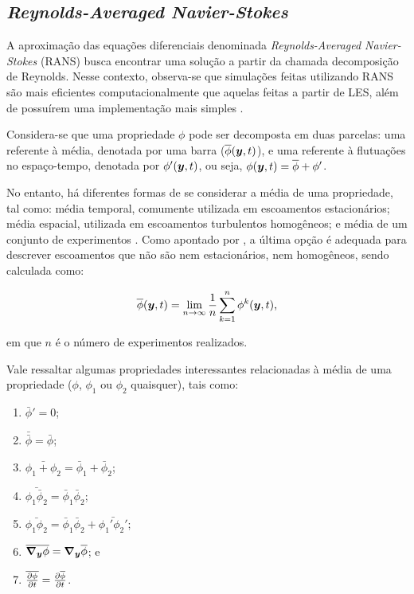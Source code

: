 \subsection{\textit{Reynolds-Averaged Navier-Stokes}} \label{RANS}

A aproximação das equações diferenciais denominada \textit{Reynolds-Averaged Navier-Stokes} (RANS) busca encontrar uma solução a partir da chamada decomposição de Reynolds. Nesse contexto, observa-se que simulações feitas utilizando RANS são mais eficientes computacionalmente que aquelas feitas a partir de LES, além de possuírem uma implementação mais simples \cite{alfonsi2009reynolds, ling2015evaluation}.

Considera-se que uma propriedade $\phi$ pode ser decomposta em duas parcelas: uma referente à média, denotada por uma barra ($\overline{\phi}(\boldsymbol{y},t)$), e uma referente à flutuações no espaço-tempo, denotada por $\phi'(\boldsymbol{y},t)$, ou seja, $\phi(\boldsymbol{y},t)=\overline{\phi}+\phi'$.

No entanto, há diferentes formas de se considerar a média de uma propriedade, tal como: média temporal, comumente utilizada em escoamentos estacionários; média espacial, utilizada em escoamentos turbulentos homogêneos; e média de um conjunto de experimentos \cite{tennekes1972first,speziale1991analytical,alfonsi2009reynolds}. Como apontado por , a última opção é adequada para descrever escoamentos que não são nem estacionários, nem homogêneos, sendo calculada como:

\begin{equation}
    \overline{\phi}(\boldsymbol{y},t)=\lim_{n\to\infty}{\frac{1}{n}\sum_{k=1}^n{\phi^{k}(\boldsymbol{y},t)}}\text{,}
\end{equation}

\noindent em que $n$ é o número de experimentos realizados.

Vale ressaltar algumas propriedades interessantes relacionadas à média de uma propriedade ($\phi$, $\phi_1$ ou $\phi_2$ quaisquer), tais como:

\begin{enumerate}[label=\alph*.]
    \item $\bar{\phi}'=0$;
    \item $\bar{\bar{\phi}}=\bar{\phi}$;
    \item $\bar{\phi_1+\phi_2}=\bar{\phi}_1+\bar{\phi}_2$;
    \item $\bar{\phi_1\bar{\phi}_2}=\bar{\phi}_1\bar{\phi}_2$;
    \item $\bar{\phi_1\phi_2}=\bar{\phi}_1\bar{\phi}_2+\bar{\phi_1'\phi_2'}$;
    \item $\overline{\boldsymbol{\nabla_y}\phi}=\boldsymbol{\nabla_y}\overline{\phi}$; e
    \item $\overline{\frac{\partial{\phi}}{\partial{t}}}=\frac{\partial{\overline{\phi}}}{\partial{t}}$.
\end{enumerate}

